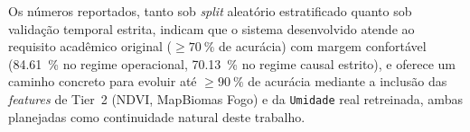 Os números reportados, tanto sob \emph{split} aleatório estratificado quanto sob validação temporal estrita, indicam que o sistema desenvolvido atende ao requisito acadêmico original (\(\geq \SI{70}{\percent}\) de acurácia) com margem confortável (\SI{84,61}{\percent} no regime operacional, \SI{70,13}{\percent} no regime causal estrito), e oferece um caminho concreto para evoluir até \(\geq \SI{90}{\percent}\) de acurácia mediante a inclusão das \emph{features} de Tier~2 (NDVI, MapBiomas Fogo) e da \texttt{Umidade} real retreinada, ambas planejadas como continuidade natural deste trabalho.


\backmatter
